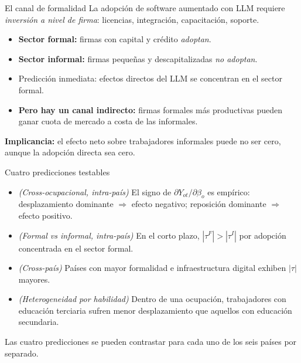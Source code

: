 \documentclass[9pt, aspectratio=169]{beamer}
\begin{document}
\begin{frame}{El canal de formalidad}
  La adopción de software aumentado con LLM requiere \emph{inversión a nivel de firma}: licencias, integración, capacitación, soporte.
  \vfill
  \begin{itemize}
    \setlength\itemsep{0.5em}
    \item \textbf{Sector formal:} firmas con capital y crédito \emph{adoptan}.
    \item \textbf{Sector informal:} firmas pequeñas y descapitalizadas \emph{no adoptan}.
    \item Predicción inmediata: efectos directos del LLM se concentran en el sector formal.
    \item \textbf{Pero hay un canal indirecto:} firmas formales más productivas pueden ganar cuota de mercado a costa de las informales.
  \end{itemize}
  \vfill
  \textbf{Implicancia:} el efecto neto sobre trabajadores informales puede no ser cero, aunque la adopción directa sea cero.
\end{frame}

\begin{frame}{Cuatro predicciones testables}
  \small
  \begin{itemize}
    \setlength\itemsep{0.45em}
    \item[\textbf{P1.}] \emph{(Cross-ocupacional, intra-país)} El signo de $\partial Y_{ot}/\partial \beta_o$ es empírico:
      desplazamiento dominante $\Rightarrow$ efecto negativo;
      reposición dominante $\Rightarrow$ efecto positivo.
    \item[\textbf{P2.}] \emph{(Formal vs informal, intra-país)} En el corto plazo,
      $|\tau^{F}| > |\tau^{I}|$ por adopción concentrada en el sector formal.
    \item[\textbf{P3.}] \emph{(Cross-país)} Países con mayor formalidad e infraestructura digital exhiben $|\tau|$ mayores.
    \item[\textbf{P4.}] \emph{(Heterogeneidad por habilidad)} Dentro de una ocupación, trabajadores con educación terciaria sufren menor desplazamiento que aquellos con educación secundaria.
  \end{itemize}
  \vfill
  \normalsize
  Las cuatro predicciones se pueden contrastar para cada uno de los seis países por separado.
\end{frame}
\end{document}
